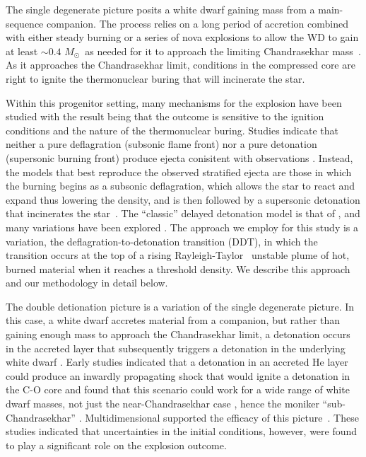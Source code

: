\documentclass[iop,apj]{emulateapj}
\newcommand{\Msun}{\ensuremath{M_\odot}}
\begin{document}
The single degenerate picture posits a white dwarf gaining mass
from a main-sequence companion. The process relies on a long
period of accretion combined with either steady burning or a 
series of nova explosions to allow the WD to gain at least
$\sim 0.4$ \Msun\ as needed for it to approach the
limiting Chandrasekhar mass~\citep{starrfieldetal2012}. As it approaches
the Chandrasekhar limit, conditions in the compressed core are right
to ignite the thermonuclear buring that will incinerate the star. 

Within this progenitor setting, many mechanisms for the explosion have 
been studied with the result being that the outcome is sensitive to
the ignition conditions and the nature of the thermonuclear buring.
Studies indicate that neither a pure deflagration (subsonic flame front)
nor a pure detonation (supersonic burning front) produce ejecta conisitent
with observations \citep{arnett69,roepkeetal07}.  Instead, the models 
that best reproduce the observed stratified ejecta are those in which 
the burning begins as a subsonic deflagration, which allows the star 
to react and expand thus lowering the density, and is then followed by a 
supersonic detonation that incinerates the 
star~\citep{Nomo84,Khokhlov1991Delayed-detonat,HoefKhok96,GameKhokOran05}.
The ``classic'' delayed detonation model is that of 
\citet{Khokhlov1991Delayed-detonat} \citep[See also][]{hoflich.khokhlov.ea:delayed,GameKhokOran05},
and many variations have been 
explored \citep[and references therein]{hillebrandtetal2013,calderetal2013}.
The approach we employ for this study is a variation, the 
deflagration-to-detonation transition (DDT), in which the transition
occurs at the top of a rising Rayleigh-Taylor~\citep{taylor+50,chandra+81} 
unstable plume of hot, burned 
material when it reaches a threshold density.
We describe this approach and our methodology in detail below.

The double detionation picture is a variation of the single degenerate picture.
In this case, a white dwarf accretes material from a companion, but rather
than gaining enough mass to approach the Chandrasekhar limit, a detonation
occurs in the accreted layer that subsequently triggers a detonation
in the underlying white dwarf \citet{woosleyweavertaam80,taam80a,taam80b,
nomoto80,nomoto82b}. Early studies indicated that a detonation in an 
accreted He
layer could produce an inwardly propagating
shock that would ignite a detonation in the C-O core and found
that this scenario could work for a wide range of white dwarf
masses, not just the near-Chandrasekhar case \citep{livne90}, hence the
moniker ``sub-Chandrasekhar'' \citep{ww94}. Multidimensional supported the
efficacy of this picture~\citep{livneglasner91, livnearnett95,HoefKhok96,
hoeflichetal96, wigginsfalle97,wigginsetal98,garciasenzbravowoosley99}. 
These studies indicated that uncertainties in the initial conditions, 
however, were found to play a significant role on the explosion outcome. 
\end{document}
